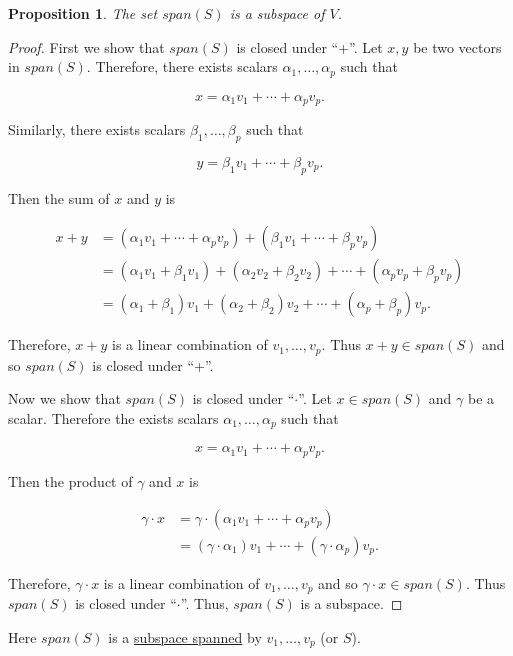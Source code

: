\documentclass[12pt]{article}
\newtheorem*{proposition}{Proposition}
\theoremstyle{definition}
\begin{document}
\begin{proposition}
The set $span(S)$ is a subspace of $V$.
\end{proposition}

\begin{proof}
First we show that $span(S)$ is closed under ``+''. Let $x, y$ be two vectors in $span(S)$.
Therefore, there exists scalars $\alpha_1, \ldots, \alpha_p$ such that

\[ x = \alpha_1 v_1 + \cdots + \alpha_p v_p. \]

Similarly, there exists scalars $\beta_1, \ldots, \beta_p$ such that 

\[ y = \beta_1 v_1 + \cdots + \beta_p v_p. \]

Then the sum of $x$ and $y$ is

\begin{align*}
x + y &= (\alpha_1 v_1 + \cdots + \alpha_p v_p) + (\beta_1 v_1 + \cdots + \beta_p v_p) \\
&= (\alpha_1 v_1 + \beta_1 v_1) + (\alpha_2 v_2 + \beta_2 v_2) + \cdots + (\alpha_p v_p + \beta_p v_p) \\
&= (\alpha_1 + \beta_1) v_1 + (\alpha_2 + \beta_2) v_2 + \cdots + (\alpha_p + \beta_p) v_p. 
\end{align*}

Therefore, $x + y$ is a linear combination of $v_1, \ldots, v_p$. Thus $x + y \in span(S)$ and so
$span(S)$ is closed under ``+''.

Now we show that $span(S)$ is closed under ``$\cdot$''. Let $x \in span(S)$ and $\gamma$ be a scalar.
Therefore the exists scalars $\alpha_1, \ldots, \alpha_p$ such that

\[
x = \alpha_1 v_1 + \cdots + \alpha_p v_p.
\]

Then the product of $\gamma$ and $x$ is

\begin{align*}
\gamma \cdot x &= \gamma \cdot (\alpha_1 v_1 + \cdots + \alpha_p v_p) \\
&= (\gamma \cdot \alpha_1) v_1 + \cdots + (\gamma \cdot \alpha_p) v_p.
\end{align*}

Therefore, $\gamma \cdot x$ is a linear combination of $v_1, \dots, v_p$ and so
$\gamma \cdot x \in span(S)$. Thus $span(S)$ is closed under ``$\cdot$''. Thus,
$span(S)$ is a subspace.
\end{proof}

Here $span(S)$ is a \underline{subspace spanned} by $v_1, \dots, v_p$ (or $S$).
\end{document}
